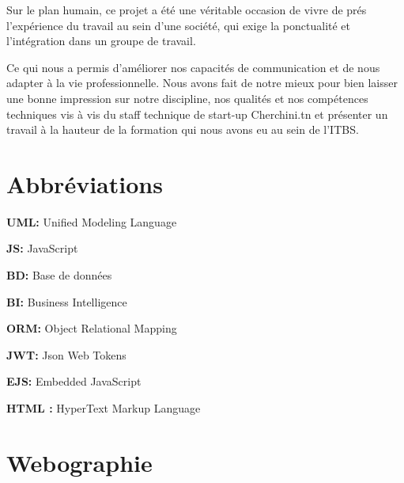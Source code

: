Sur le plan humain, ce projet a \'{e}t\'{e} une v\'{e}ritable occasion de vivre de pr\'{e}s l'exp\'{e}rience du travail au sein d'une soci\'{e}t\'{e}, qui exige la ponctualit\'{e} et l'int\'{e}gration dans un groupe de travail.

Ce qui nous a permis d'am\'{e}liorer nos capacit\'{e}s de communication et de nous adapter \`{a} la vie professionnelle. Nous avons fait de notre mieux pour bien laisser une bonne impression sur notre discipline, nos qualit\'{e}s et nos comp\'{e}tences techniques vis \`{a} vis du staff technique de start-up Cherchini.tn et pr\'{e}senter un travail \`{a} la hauteur de la formation qui nous avons
eu au sein de l'ITBS.

\chapter*{Abbr\'{e}viations}
\bigskip

\textbf{UML: }
Unified Modeling Language
\newline

\textbf{JS: }
JavaScript
\newline

\textbf{BD: }
Base de données
\newline

\textbf{ BI:}
Business Intelligence
\newline

\textbf{ORM: }
Object Relational Mapping
\newline

\textbf{JWT: }
Json Web Tokens
\newline

\textbf{EJS: }
Embedded JavaScript
\newline


\textbf{HTML : }
HyperText Markup Language
\newline


\chapter*{Webographie}

